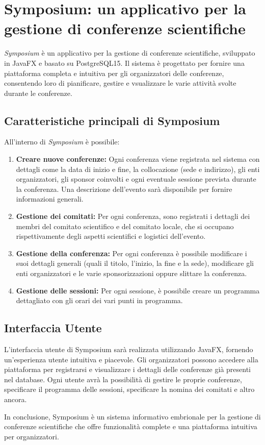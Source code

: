 \section{Symposium: un applicativo per la gestione di conferenze scientifiche}
\textit{Symposium} è un applicativo per la gestione di conferenze scientifiche, sviluppato in JavaFX e basato su PostgreSQL15. Il sistema è progettato per fornire una piattaforma completa e intuitiva per gli organizzatori delle conferenze, consentendo loro di pianificare, gestire e vsualizzare le varie attività svolte durante le conferenze.

\subsection{Caratteristiche principali di Symposium}
All'interno di \textit{Symposium} è possibile:
\begin{enumerate}
\item \textbf{Creare nuove conferenze:}
	Ogni conferenza viene registrata nel sistema con dettagli come la data di inizio e fine, la collocazione (sede e indirizzo), gli enti organizzatori, gli sponsor coinvolti e ogni eventuale sessione prevista durante la conferenza.  Una descrizione dell'evento sarà disponibile per fornire informazioni generali.
\item \textbf{Gestione dei comitati:}
	Per ogni conferenza, sono registrati i dettagli dei membri del comitato scientifico e del comitato locale, che si occupano rispettivamente degli aspetti scientifici e logistici dell'evento.
\item \textbf{Gestione della conferenza:}
	Per ogni conferenza è possibile modificare i suoi dettagli generali (quali il titolo, l'inizio, la fine e la sede), modificare gli enti organizzatori e le varie sponsorizzazioni oppure slittare la conferenza.
\item \textbf{Gestione delle sessioni:}
	Per ogni sessione, è possibile creare un programma dettagliato con gli orari dei vari punti in programma.
\end{enumerate}


\subsection{Interfaccia Utente}

L'interfaccia utente di Symposium sarà realizzata utilizzando JavaFX, fornendo un'esperienza utente intuitiva e piacevole. Gli organizzatori possono accedere alla piattaforma per registrarsi e visualizzare i dettagli delle conferenze già presenti nel database. Ogni utente avrà la possibilità di gestire le proprie conferenze, specificare il programma delle sessioni, specificare la nomina dei comitati e altro ancora.
\bigskip

In conclusione, Symposium è un sistema informativo embrionale per la gestione di conferenze scientifiche che offre funzionalità complete e una piattaforma intuitiva per organizzatori.